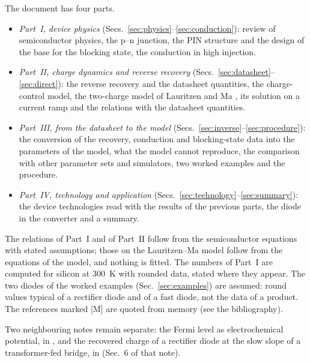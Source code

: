 \documentclass[10pt,a4paper]{scrartcl}
\begin{document}
The document has four parts.
\begin{itemize}
\item \emph{Part~I, device physics} (Secs.~\ref{sec:physics}--\ref{sec:conduction}): review of semiconductor physics, the p--n junction, the PIN structure and the design of the base for the blocking state, the conduction in high injection.
\item \emph{Part~II, charge dynamics and reverse recovery} (Secs.~\ref{sec:datasheet}--\ref{sec:direct}): the reverse recovery and the datasheet quantities, the charge-control model, the two-charge model of Lauritzen and Ma \cite{lauritzen1991}, its solution on a current ramp and the relations with the datasheet quantities.
\item \emph{Part~III, from the datasheet to the model} (Secs.~\ref{sec:inverse}--\ref{sec:procedure}): the conversion of the recovery, conduction and blocking-state data into the parameters of the model, what the model cannot reproduce, the comparison with other parameter sets and simulators, two worked examples and the procedure.
\item \emph{Part~IV, technology and application} (Secs.~\ref{sec:technology}--\ref{sec:summary}): the device technologies read with the results of the previous parts, the diode in the converter and a summary.
\end{itemize}
The relations of Part~I and of Part~II follow from the semiconductor equations with stated assumptions; those on the Lauritzen--Ma model follow from the equations of the model, and nothing is fitted. The numbers of Part~I are computed for silicon at \SI{300}{\kelvin} with rounded data, stated where they appear. The two diodes of the worked examples (Sec.~\ref{sec:examples}) are assumed: round values typical of a rectifier diode and of a fast diode, not the data of a product. The references marked [M] are quoted from memory (see the bibliography).

Two neighbouring notes remain separate: the Fermi level as electrochemical potential, in {\def\UrlBreaks{\do\/\do\_}}, and the recovered charge of a rectifier diode at the slow slope of a transformer-fed bridge, in  (Sec.~6 of that note).
\end{document}
